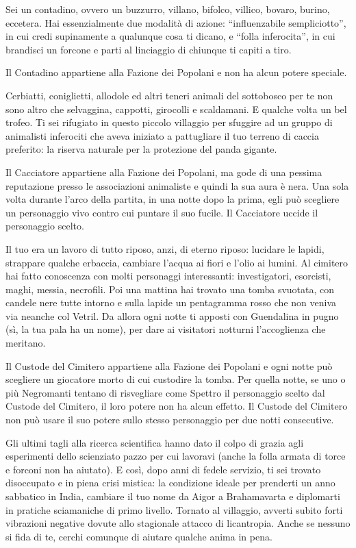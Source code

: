 {%
Sei un contadino, ovvero un buzzurro, villano, bifolco, villico, bovaro, burino, eccetera. Hai essenzialmente due modalità di azione: ``influenzabile sempliciotto'', in cui credi supinamente a qualunque cosa ti dicano, e ``folla inferocita'', in cui brandisci un forcone e parti al linciaggio di
chiunque ti capiti a tiro.

Il Contadino appartiene alla Fazione dei Popolani e non ha alcun potere speciale.
{%


{%
Cerbiatti, coniglietti, allodole ed altri teneri animali del sottobosco per te non sono altro che selvaggina, cappotti, girocolli e scaldamani. E qualche volta un bel trofeo. Ti sei rifugiato in questo piccolo villaggio per sfuggire ad un gruppo di animalisti inferociti che aveva iniziato a pattugliare il tuo terreno di caccia preferito: la riserva naturale per la protezione del panda gigante.

Il Cacciatore appartiene alla Fazione dei Popolani, ma gode di una pessima reputazione presso le associazioni animaliste e quindi la sua aura è nera. Una sola volta durante l'arco della partita, in una notte dopo la prima, egli può scegliere un personaggio vivo contro cui puntare il suo fucile. Il Cacciatore uccide il personaggio scelto.
{%


{%
Il tuo era un lavoro di tutto riposo, anzi, di eterno riposo: lucidare le lapidi, strappare qualche erbaccia, cambiare l'acqua ai fiori e l'olio ai lumini. Al cimitero hai fatto conoscenza con molti personaggi interessanti: investigatori, esorcisti, maghi, messia, necrofili. Poi una mattina hai trovato una tomba svuotata, con candele nere tutte intorno e sulla lapide un pentagramma rosso che non veniva via neanche col Vetril. Da allora ogni notte ti apposti con Guendalina in pugno (sì, la tua pala ha un nome), per dare ai visitatori notturni l'accoglienza che meritano.

Il Custode del Cimitero appartiene alla Fazione dei Popolani e ogni notte può scegliere un giocatore morto di cui custodire la tomba. Per quella notte, se uno o più Negromanti tentano di risvegliare come Spettro il personaggio scelto dal Custode del Cimitero, il loro potere non ha alcun effetto. Il Custode del Cimitero non può usare il suo potere sullo stesso personaggio per due notti consecutive.
{%


{%
Gli ultimi tagli alla ricerca scientifica hanno dato il colpo di grazia agli esperimenti dello scienziato pazzo per cui lavoravi (anche la folla armata di torce e forconi non ha aiutato). E così, dopo anni di fedele servizio, ti sei trovato disoccupato e in piena crisi mistica: la condizione ideale per prenderti un anno sabbatico in India, cambiare il tuo nome da Aigor a Brahamavarta e diplomarti in pratiche sciamaniche di primo livello. Tornato al villaggio, avverti subito forti vibrazioni negative dovute allo stagionale attacco di licantropia. Anche se nessuno si fida di te, cerchi comunque di aiutare qualche anima in pena.

}}}}}}}
